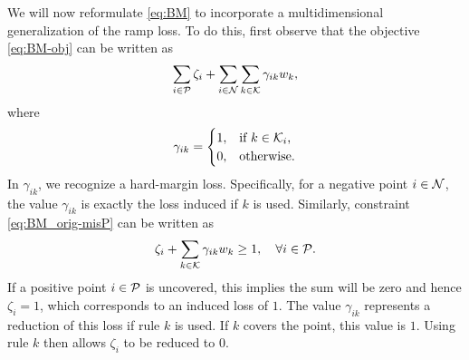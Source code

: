 We will now reformulate \eqref{eq:BM} to incorporate a multidimensional generalization of the ramp loss.
To do this, first observe that the objective \eqref{eq:BM-obj} can be written as
\begin{equation*}
    \sum_{i \in \mathcal{P}} \zeta_i + \sum_{i \in \mathcal{N}} \sum_{k \in \mathcal{K}} \gamma_{ik} w_k,
\end{equation*} where
\[\gamma_{ik} = \begin{cases}
                    1, & \text{if $k \in \mathcal{K}_i$,} \\
                    0, & \text{otherwise}.
\end{cases}\]
In $\gamma_{ik}$, we recognize a hard-margin loss.
Specifically, for a negative point $i \in \mathcal{N}$, the value $\gamma_{ik}$ is exactly the loss induced if $k$ is used.
Similarly, constraint \eqref{eq:BM_orig-misP} can be written as
\begin{equation*}
    \zeta_i + \sum_{k \in \mathcal{K}} \gamma_{ik} w_k \geq 1, \quad \forall i \in \mathcal{P}.
\end{equation*}
If a positive point $i \in \mathcal{P}$ is uncovered, this implies the sum will be zero and hence $\zeta_i = 1$, which corresponds to an induced loss of $1$.
The value $\gamma_{ik}$ represents a reduction of this loss if rule $k$ is used.
If $k$ covers the point, this value is $1$.
Using rule $k$ then allows $\zeta_i$ to be reduced to $0$.


